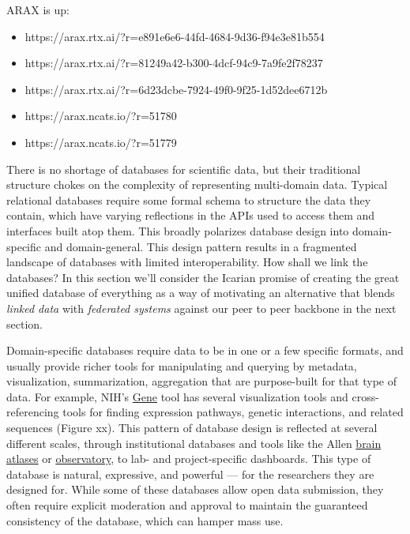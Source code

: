 ARAX is up:

\begin{itemize}

\item
  https://arax.rtx.ai/?r=e891e6e6-44fd-4684-9d36-f94e3e81b554
\item
  https://arax.rtx.ai/?r=81249a42-b300-4dcf-94c9-7a9fe2f78237
\item
  https://arax.rtx.ai/?r=6d23dcbe-7924-49f0-9f25-1d52dee6712b
\item
  https://arax.ncats.io/?r=51780
\item
  https://arax.ncats.io/?r=51779
\end{itemize}

There is no shortage of databases for scientific data, but their
traditional structure chokes on the complexity of representing
multi-domain data. Typical relational databases require some formal
schema to structure the data they contain, which have varying
reflections in the APIs used to access them and interfaces built atop
them. This broadly polarizes database design into domain-specific and
domain-general. This design pattern results in a
fragmented landscape of databases with limited interoperability. How
shall we link the databases? In this section we'll consider the Icarian
promise of creating the great unified database of everything as a way of
motivating an alternative that blends \emph{linked data} \citep{berners-leeLinkedData2006}  with \emph{federated systems} against our
peer to peer backbone in the next section.

Domain-specific databases require data to be in one or a few specific
formats, and usually provide richer tools for manipulating and querying
by metadata, visualization, summarization, aggregation that are
purpose-built for that type of data. For example, NIH's
\href{https://www.ncbi.nlm.nih.gov/gene/12550}{Gene} tool has several
visualization tools and cross-referencing tools for finding expression
pathways, genetic interactions, and related sequences (Figure xx). This
pattern of database design is reflected at several different scales,
through institutional databases and tools like the Allen
\href{https://connectivity.brain-map.org/}{brain atlases} or
\href{http://observatory.brain-map.org/visualcoding/}{observatory}, to
lab- and project-specific dashboards. This type of database is natural,
expressive, and powerful --- for the researchers they are designed for.
While some of these databases allow open data submission, they often
require explicit moderation and approval to maintain the guaranteed
consistency of the database, which can hamper mass use.

